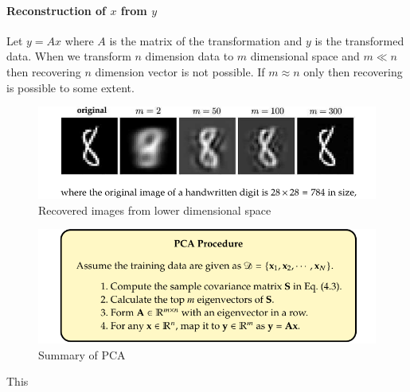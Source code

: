 \documentclass[12pt,reqno]{amsart}
\theoremstyle{plain}
\theoremstyle{definition}
\begin{document}
\paragraph{\bf Reconstruction of $x$ from $y$} Let $y = Ax$ where $A$ is the matrix of the transformation and $y$ is the transformed data. When we transform $n$ dimension data to $m$ dimensional space and $m \ll n$ then recovering $n$ dimension vector is not possible. If $m \approx n$ only then recovering is possible to some extent.
\begin{figure}[!ht]
    \centerline{\includegraphics[scale=.5]{ assets/recover.png}}
    \caption{Recovered images from lower dimensional space}
    \label{fig4}
\end{figure}
\begin{figure}[!ht]
    \centerline{\includegraphics[scale=.6]{ assets/summary_pca.png}}
    \caption{Summary of PCA}
    \label{fig3}
\end{figure}
This 
\end{document}
